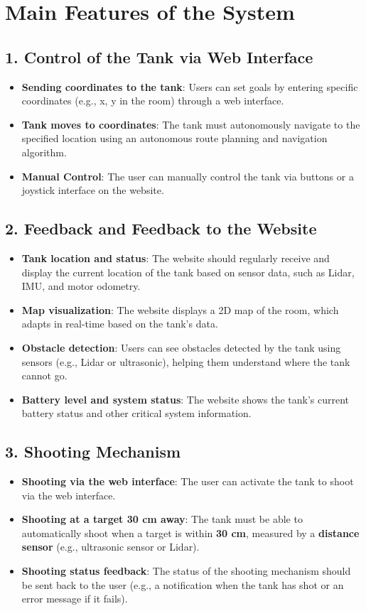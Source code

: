 \documentclass[a4paper,12pt]{article}
\begin{document}
\section*{Main Features of the System}

\subsection*{1. Control of the Tank via Web Interface}
\begin{itemize}
    \item \textbf{Sending coordinates to the tank}: Users can set goals by entering specific coordinates (e.g., x, y in the room) through a web interface.
    \item \textbf{Tank moves to coordinates}: The tank must autonomously navigate to the specified location using an autonomous route planning and navigation algorithm.
    \item \textbf{Manual Control}: The user can manually control the tank via buttons or a joystick interface on the website.
\end{itemize}

\subsection*{2. Feedback and Feedback to the Website}
\begin{itemize}
    \item \textbf{Tank location and status}: The website should regularly receive and display the current location of the tank based on sensor data, such as Lidar, IMU, and motor odometry.
    \item \textbf{Map visualization}: The website displays a 2D map of the room, which adapts in real-time based on the tank's data.
    \item \textbf{Obstacle detection}: Users can see obstacles detected by the tank using sensors (e.g., Lidar or ultrasonic), helping them understand where the tank cannot go.
    \item \textbf{Battery level and system status}: The website shows the tank’s current battery status and other critical system information.
\end{itemize}

\subsection*{3. Shooting Mechanism}
\begin{itemize}
    \item \textbf{Shooting via the web interface}: The user can activate the tank to shoot via the web interface.
    \item \textbf{Shooting at a target 30 cm away}: The tank must be able to automatically shoot when a target is within \textbf{30 cm}, measured by a \textbf{distance sensor} (e.g., ultrasonic sensor or Lidar).
    \item \textbf{Shooting status feedback}: The status of the shooting mechanism should be sent back to the user (e.g., a notification when the tank has shot or an error message if it fails).
\end{itemize}
\end{document}
